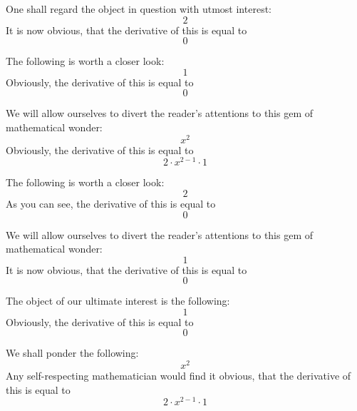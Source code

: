 \documentclass{article}
\begin{document}
One shall regard the object in question with utmost interest:
\begin{equation}
2 
\end{equation}
It is now obvious, that the derivative of this is equal to
\begin{equation}
0 
\end{equation}

The following is worth a closer look:
\begin{equation}
1 
\end{equation}
Obviously, the derivative of this is equal to
\begin{equation}
0 
\end{equation}

We will allow ourselves to divert the reader's attentions to this gem of mathematical wonder:
\begin{equation}
x ^{2 } 
\end{equation}
Obviously, the derivative of this is equal to
\begin{equation}
2 \cdot x ^{2 - 1 } \cdot 1 
\end{equation}

The following is worth a closer look:
\begin{equation}
2 
\end{equation}
As you can see, the derivative of this is equal to
\begin{equation}
0 
\end{equation}

We will allow ourselves to divert the reader's attentions to this gem of mathematical wonder:
\begin{equation}
1 
\end{equation}
It is now obvious, that the derivative of this is equal to
\begin{equation}
0 
\end{equation}

The object of our ultimate interest is the following:
\begin{equation}
1 
\end{equation}
Obviously, the derivative of this is equal to
\begin{equation}
0 
\end{equation}

We shall ponder the following:
\begin{equation}
x ^{2 } 
\end{equation}
Any self-respecting mathematician would find it obvious, that the derivative of this is equal to
\begin{equation}
2 \cdot x ^{2 - 1 } \cdot 1 
\end{equation}
\end{document}
